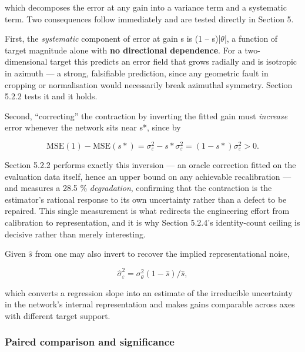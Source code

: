 which decomposes the error at any gain into a variance term and a systematic term. Two consequences follow immediately and are tested directly in Section 5.

First, the \emph{systematic} component of error at gain s is (1 -- s)|$\theta$|, a function of target magnitude alone with \textbf{no directional dependence}. For a two-dimensional target this predicts an error field that grows radially and is isotropic in azimuth --- a strong, falsifiable prediction, since any geometric fault in cropping or normalisation would necessarily break azimuthal symmetry. Section 5.2.2 tests it and it holds.

Second, ``correcting'' the contraction by inverting the fitted gain must \emph{increase} error whenever the network sits near s*, since by 

\begin{equation}
\label{eq:157}
\mathrm{MSE}(1) - \mathrm{MSE}(s*) = \sigma _{\varepsilon} ^{2} - s* \sigma _{\varepsilon} ^{2} = ( 1 - s* ) \sigma _{\varepsilon} ^{2} > 0 .
\end{equation}

Section 5.2.2 performs exactly this inversion --- an oracle correction fitted on the evaluation data itself, hence an upper bound on any achievable recalibration --- and measures a 28.5 \% \emph{degradation}, confirming that the contraction is the estimator's rational response to its own uncertainty rather than a defect to be repaired. This single measurement is what redirects the engineering effort from calibration to representation, and it is why Section 5.2.4's identity-count ceiling is decisive rather than merely interesting.

Given $\hat{s}$ from  one may also invert  to recover the implied representational noise,

\begin{equation}
\label{eq:158}
\hat{\sigma }_{\varepsilon} ^{2} = \sigma _{\theta} ^{2} ( 1 - \hat{s} ) / \hat{s} ,
\end{equation}

which converts a regression slope into an estimate of the irreducible uncertainty in the network's internal representation and makes gains comparable across axes with different target support.

\subsubsection{Paired comparison and significance}

